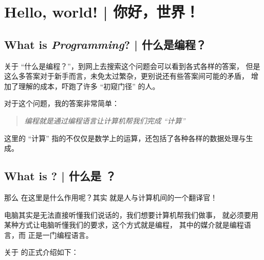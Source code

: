 \section{Hello, world! | 你好，世界！}
\label{sec:begin:hello-world}


\subsection{What is \emph{Programming}? | 什么是编程？}
\label{subsec:begin:hello-world:what-is-programming}

关于 ``什么是编程？''，到网上去搜索这个问题会可以看到各式各样的答案，
但是这么多答案对于新手而言，未免太过繁杂，更别说还有些答案间可能的矛盾，
增加了理解的成本，吓跑了许多 ``初窥门径'' 的人。

对于这个问题，我的答案非常简单：

\begin{quotation}
    \large\textit{
        编程就是通过编程语言让计算机帮我们完成 ``\emph{计算}''}
\end{quotation}

这里的 ``计算'' 指的不仅仅是数学上的运算，还包括了各种各样的数据处理与生成。

\subsection{What is \Py? | 什么是 \Py？}
\label{subsec:begin:hello-world:what-is-python}

那么 \Py 在这里是什么作用呢？其实 \Py 就是人与计算机间的一个翻译官！

电脑其实是无法直接听懂我们说话的，我们想要计算机帮我们做事，
就必须要用某种方式让电脑听懂我们的要求，这个方式就是编程，
其中的媒介就是编程语言，而 \Py 正是一门编程语言。

关于 \Py 的正式介绍如下：


